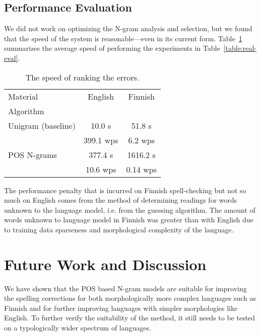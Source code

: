 \documentclass{llncs}
\begin{document}
\subsection{Performance Evaluation}

We did not work on optimizing the N-gram analysis and selection,
but we found that the speed of the system is reasonable---even in its current
form. Table~\ref{table:speed-eval} summarizes the average
speed of performing the experiments in Table~\ref{table:real-eval}.

\begin{table}
    \caption{The speed of ranking the errors.
    \label{table:speed-eval}}
  \begin{center}
      \begin{tabular}{lcc}
        \hline
        Material  & English &  Finnish \\
        Algorithm &         &          \\
        \hline
        Unigram (baseline)
 & 10.0 s    & 51.8 s  \\
 & 399.1 wps & 6.2 wps \\
        \hline
        POS N-grams 
 &   377.4 s & 1616.2 s \\
 & 10.6  wps & 0.14 wps \\
        \hline
      \end{tabular}
  \end{center}
\end{table}

The performance penalty that is incurred on Finnish spell-checking but not so
much on English comes from the method of determining readings for words unknown
to the language model, i.e. from the guessing algorithm. The amount of words
unknown to language model in Finnish was greater than with English due to
training data sparseness and morphological complexity of the language.

\section{Future Work and Discussion}
\label{sec:future-work}

We have shown that the POS based N-gram models are suitable for improving the
spelling corrections for both morphologically more complex languages such as
Finnish and for further improving languages with simpler morphologies like
English. To further verify the suitability of the method, it still needs to be
tested on a typologically wider spectrum of languages.
\end{document}
